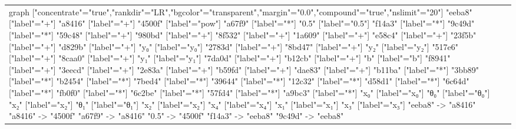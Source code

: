 \documentclass{beamer}
\begin{document}
\begin{frame}[fragile]
\begin{table}[H]
\begin{tabular}{lll}
\begin{adjustbox}{minipage={.4\textwidth}, height=0.22\textwidth, margin*=0cm 0cm 0cm 0.1cm}
{                        graph ["concentrate"="true","rankdir"="LR","bgcolor"="transparent","margin"="0.0","compound"="true","nslimit"="20"]
                        "eeba8" ["label"="+"]
                        "a8416" ["label"="+"]
                        "4500f" ["label"="pow"]
                        "a67f9" ["label"="*"]
                        "0.5" ["label"="0.5"]
                        "f14a3" ["label"="*"]
                        "9c49d" ["label"="*"]
                        "59c48" ["label"="+"]
                        "980bd" ["label"="+"]
                        "8f532" ["label"="+"]
                        "1a609" ["label"="+"]
                        "e58c4" ["label"="+"]
                        "23f5b" ["label"="+"]
                        "d829b" ["label"="+"]
                        "y₀" ["label"="y₀"]
                        "2783d" ["label"="+"]
                        "8bd47" ["label"="+"]
                        "y₂" ["label"="y₂"]
                        "517e6" ["label"="+"]
                        "8caa0" ["label"="+"]
                        "y₁" ["label"="y₁"]
                        "7da0d" ["label"="+"]
                        "b12cb" ["label"="+"]
                        "b" ["label"="b"]
                        "f8941" ["label"="+"]
                        "3eecd" ["label"="+"]
                        "2e83a" ["label"="+"]
                        "b59fd" ["label"="+"]
                        "dae83" ["label"="+"]
                        "b11ba" ["label"="*"]
                        "3bb89" ["label"="*"]
                        "b2454" ["label"="*"]
                        "7bed4" ["label"="*"]
                        "39644" ["label"="*"]
                        "12c32" ["label"="*"]
                        "d58d1" ["label"="*"]
                        "6c64d" ["label"="*"]
                        "fb0f0" ["label"="*"]
                        "6c2be" ["label"="*"]
                        "57fd4" ["label"="*"]
                        "a9bc3" ["label"="*"]
                        "x₀" ["label"="x₀"]
                        "θ₀" ["label"="θ₀"]
                        "x₂" ["label"="x₂"]
                        "θ₁" ["label"="θ₁"]
                        "x₂" ["label"="x₂"]
                        "x₄" ["label"="x₄"]
                        "x₁" ["label"="x₁"]
                        "x₃" ["label"="x₃"]
                        "eeba8" -> "a8416"
                        "a8416" -> "4500f"
                        "a67f9" -> "a8416"
                        "0.5" -> "4500f"
                        "f14a3" -> "eeba8"
                        "9c49d" -> "eeba8"
}
\end{adjustbox}
\end{tabular}
\end{table}
\end{frame}
\end{document}
